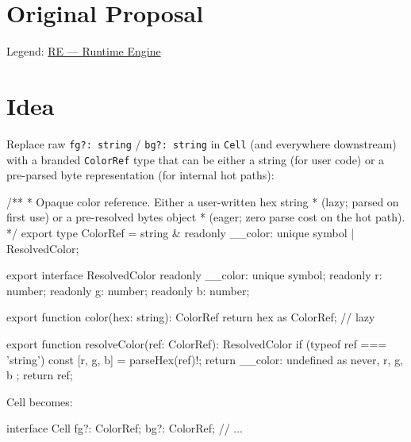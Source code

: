 \section{Original Proposal}\label{record-371-original-proposal}

Legend: \href{https://github.com/flyingrobots/bijou/blob/1853ad902f6bf219326409e7f743a5a1d6517dbc/docs/legends/RE-runtime-engine.md}{RE --- Runtime Engine}

\section{Idea}\label{record-371-idea}

Replace raw \texttt{f\allowbreak{}g\allowbreak{}?\allowbreak{}:\allowbreak{} \allowbreak{}s\allowbreak{}t\allowbreak{}r\allowbreak{}i\allowbreak{}n\allowbreak{}g} / \texttt{b\allowbreak{}g\allowbreak{}?\allowbreak{}:\allowbreak{} \allowbreak{}s\allowbreak{}t\allowbreak{}r\allowbreak{}i\allowbreak{}n\allowbreak{}g} in \texttt{C\allowbreak{}e\allowbreak{}l\allowbreak{}l} (and everywhere downstream) with a branded \texttt{C\allowbreak{}o\allowbreak{}l\allowbreak{}o\allowbreak{}r\allowbreak{}R\allowbreak{}e\allowbreak{}f} type that can be either a string (for user code) or a pre-parsed byte representation (for internal hot paths):

\begin{CodeBlock}
/**
 * Opaque color reference. Either a user-written hex string
 * (lazy; parsed on first use) or a pre-resolved bytes object
 * (eager; zero parse cost on the hot path).
 */
export type ColorRef = string & { readonly __color: unique symbol }
                     | ResolvedColor;

export interface ResolvedColor {
  readonly __color: unique symbol;
  readonly r: number;
  readonly g: number;
  readonly b: number;
}

export function color(hex: string): ColorRef {
  return hex as ColorRef;  // lazy
}

export function resolveColor(ref: ColorRef): ResolvedColor {
  if (typeof ref === 'string') {
    const [r, g, b] = parseHex(ref)!;
    return { __color: undefined as never, r, g, b };
  }
  return ref;
}
\end{CodeBlock}

Cell becomes:

\begin{CodeBlock}
interface Cell {
  fg?: ColorRef;
  bg?: ColorRef;
  // ...
}
\end{CodeBlock}

